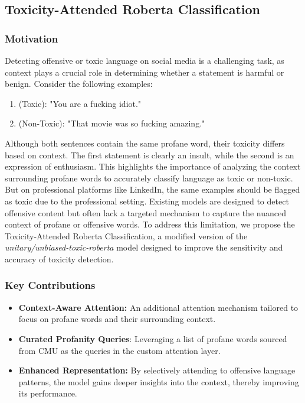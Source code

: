\subsection{Toxicity-Attended Roberta Classification}

\subsubsection{Motivation}
Detecting offensive or toxic language on social media is a challenging task, as context plays a crucial role in determining whether a statement is harmful or benign. Consider the following examples:
\begin{enumerate}
    \item (Toxic): "You are a fucking idiot."
    \item (Non-Toxic): "That movie was so fucking amazing."
\end{enumerate}
Although both sentences contain the same profane word, their toxicity differs based on context. The first statement is clearly an insult, while the second is an expression of enthusiasm. This highlights the importance of analyzing the context surrounding profane words to accurately classify language as toxic or non-toxic. But on professional platforms like LinkedIn, the same examples should be flagged as toxic due to the professional setting.
Existing models are designed to detect offensive content but often lack a targeted mechanism to capture the nuanced context of profane or offensive words. To address this limitation, we propose the Toxicity-Attended Roberta Classification, a modified version of the \textit{unitary/unbiased-toxic-roberta} model designed to improve the sensitivity and accuracy of toxicity detection.

\subsubsection{Key Contributions}
\begin{itemize}
    \item \textbf{Context-Aware Attention:} An additional attention mechanism tailored to focus on profane words and their surrounding context.
    \item \textbf{Curated Profanity Queries}: Leveraging a list of profane words sourced from CMU as the queries in the custom attention layer.
    \item \textbf{Enhanced Representation:} By selectively attending to offensive language patterns, the model gains deeper insights into the context, thereby improving its performance.
\end{itemize}

